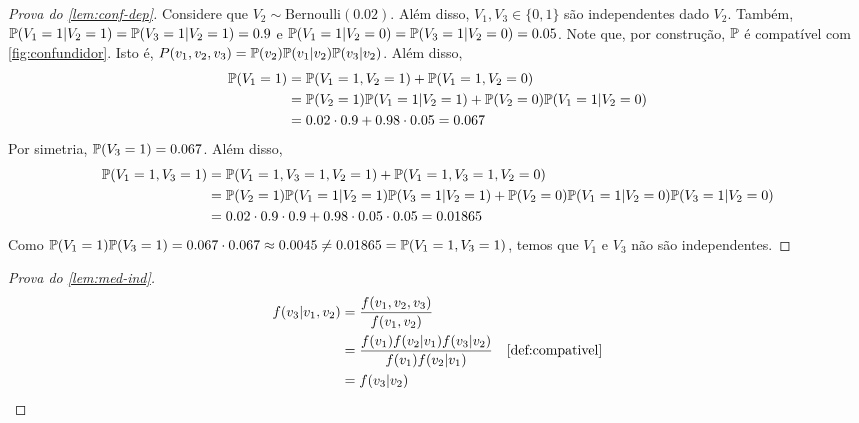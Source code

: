 \begin{proof}[Prova do \cref{lem:conf-dep}]
 Considere que $V_2 \sim \text{Bernoulli}(0.02)$.
 Além disso, $V_1, V_3 \in \{0,1\}$ são independentes dado $V_2$. 
 Também,
 $\P(V_1 = 1|V_2 = 1) = \P(V_3 = 1|V_2 = 1) = 0.9$ e
 $\P(V_1 = 1|V_2 = 0) = \P(V_3 = 1|V_2 = 0) = 0.05$.
 Note que, por construção, $\P$ é 
 compatível com \cref{fig:confundidor}.
 Isto é, $P(v_1,v_2,v_3) = \P(v_2)\P(v_1|v_2)\P(v_3|v_2)$.
 Além disso,
 \begin{align*}
  \P(V_1 = 1) &= \P(V_1 = 1, V_2 = 1) + \P(V_1 = 1, V_2 = 0) \\
              &= \P(V_2=1)\P(V_1=1|V_2=1)
               +\P(V_2=0)\P(V_1=1|V_2=0) \\
              &= 0.02 \cdot 0.9 + 0.98 \cdot 0.05= 0.067
 \end{align*}
 Por simetria, $\P(V_3=1) = 0.067$. Além disso,
 \begin{align*}
  \P(V_1 = 1, V_3 = 1)
  &= \P(V_1 = 1, V_3 = 1, V_2 = 1) 
  +  \P(V_1 = 1, V_3 = 1, V_2 = 0) \\
  &= \P(V_2 = 1)\P(V_1 = 1|V_2 = 1)\P(V_3 = 1|V_2 = 1)
  +  \P(V_2 = 0)\P(V_1 = 1|V_2 = 0)\P(V_3 = 1|V_2 = 0) \\
  &= 0.02 \cdot 0.9 \cdot 0.9 + 0.98 \cdot 0.05 \cdot 0.05 = 0.01865
 \end{align*}
 Como $\P(V_1=1)\P(V_3=1) = 0.067 \cdot 0.067 \approx 0.0045 \neq 0.01865 = \P(V_1=1,V_3=1)$,
 temos que $V_1$ e $V_3$ não são independentes.
\end{proof}

\begin{proof}[Prova do \cref{lem:med-ind}]
 \begin{align*}
  f(v_3|v_1,v_2) 
  &= \frac{f(v_1,v_2,v_3)}{f(v_1,v_2)} \\
  &= \frac{f(v_1)f(v_2|v_1)f(v_3|v_2)}{f(v_1)f(v_2|v_1)} 
  & \text{\cref{def:compativel}} \\
  &= f(v_3|v_2)
 \end{align*}
\end{proof}

